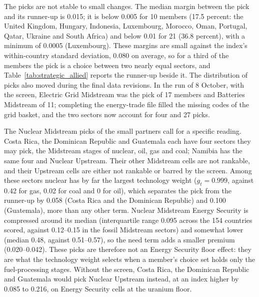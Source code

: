 The picks are not stable to small changes. The median margin between the pick and its runner-up is
0.015; it is below 0.005 for 10 members (17.5 percent: the United Kingdom, Hungary, Indonesia,
Luxembourg, Morocco, Oman, Portugal, Qatar, Ukraine and South Africa) and below 0.01 for 21 (36.8
percent), with a minimum of 0.0005 (Luxembourg). These margins are small against the index's
within-country standard deviation, 0.080 on average, so for a third of the members the pick is a
choice between two nearly equal sectors, and Table~\ref{tab:strategic_allied} reports the runner-up
beside it. The distribution of picks also moved during the final data revisions. In the run of 8
October, with the screen, Electric Grid Midstream was the pick of 17 members and Batteries
Midstream of 11; completing the energy-trade file filled the missing codes of the grid basket, and
the two sectors now account for four and 27 picks.

The Nuclear Midstream picks of the small partners call for a specific reading. Costa Rica, the
Dominican Republic and Guatemala each have four sectors they may pick, the Midstream stages of
nuclear, oil, gas and coal; Namibia has the same four and Nuclear Upstream. Their other Midstream
cells are not rankable, and their Upstream cells are either not rankable or barred by the screen.
Among these sectors nuclear has by far the largest technology weight ($g_t=0.999$, against 0.42 for
gas, 0.02 for coal and 0 for oil), which separates the pick from the runner-up by 0.058 (Costa Rica
and the Dominican Republic) and 0.100 (Guatemala), more than any other term. Nuclear Midstream
Energy Security is compressed around its median (interquartile range 0.095 across the 154
countries scored, against 0.12--0.15 in the fossil Midstream sectors) and somewhat lower (median
0.48, against 0.51--0.57), so the need term adds a smaller premium (0.020--0.042). These picks are
therefore not an Energy Security floor effect: they are what the technology weight selects when a
member's choice set holds only the fuel-processing stages. Without the screen, Costa Rica, the
Dominican Republic and Guatemala would pick Nuclear Upstream instead, at an index higher by 0.085
to 0.216, on Energy Security cells at the uranium floor.



